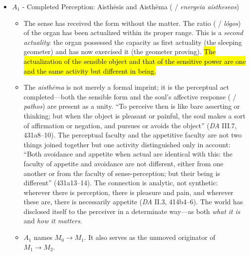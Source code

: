 \begin{itemize}
    \item $A_1$ - Completed Perception: Aisthēsis and Aisthēma ( / \textit{energeia aistheseos})
    \begin{itemize}
        \item The sense has received the form without the matter. The ratio ( / \textit{lógos}) of the organ has been actualized within its proper range. This is a \textit{second actuality}: the organ possessed the capacity as first actuality (the sleeping geometer) and has now exercised it (the geometer proving). \hl{The actualization of the sensible object and that of the sensitive power are one and the same activity but different in being.}
        \item The \textit{aisthēma} is not merely a formal imprint; it is the perceptual act completed---both the sensible form and the soul's affective response ( / \textit{pathos}) are present as a unity. ``To perceive then is like bare asserting or thinking; but when the object is pleasant or painful, the soul makes a sort of affirmation or negation, and pursues or avoids the object'' (\textit{DA} III.7, 431a8--10). The perceptual faculty and the appetitive faculty are not two things joined together but one activity distinguished only in account: ``Both avoidance and appetite when actual are identical with this: the faculty of appetite and avoidance are not different, either from one another or from the faculty of sense-perception; but their being is different'' (431a13--14). The connection is analytic, not synthetic: wherever there is perception, there is pleasure and pain, and wherever these are, there is necessarily appetite (\textit{DA} II.3, 414b4--6). The world has disclosed itself to the perceiver in a determinate way---as both \textit{what it is} and \textit{how it matters}.
        \item $A_1$ names $M_0 \rightarrow M_1$. It also serves as the unmoved originator of $M_1 \rightarrow M_2$.

\end{itemize}
\end{itemize}
